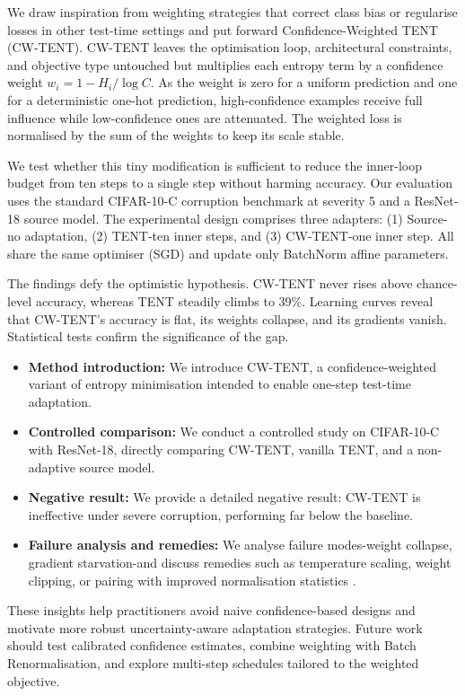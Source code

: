 \documentclass{article} %
\begin{document}
We draw inspiration from weighting strategies that correct class bias or regularise losses in other test-time settings \cite{author-year-test,zhao-2023-delta} and put forward Confidence-Weighted TENT (CW-TENT). CW-TENT leaves the optimisation loop, architectural constraints, and objective type untouched but multiplies each entropy term by a confidence weight \(w_{i} = 1 - H_{i}/\log C\). As the weight is zero for a uniform prediction and one for a deterministic one-hot prediction, high-confidence examples receive full influence while low-confidence ones are attenuated. The weighted loss is normalised by the sum of the weights to keep its scale stable.

We test whether this tiny modification is sufficient to reduce the inner-loop budget from ten steps to a single step without harming accuracy. Our evaluation uses the standard CIFAR-10-C corruption benchmark at severity 5 and a ResNet-18 source model. The experimental design comprises three adapters: (1) Source-no adaptation, (2) TENT-ten inner steps, and (3) CW-TENT-one inner step. All share the same optimiser (SGD) and update only BatchNorm affine parameters.

The findings defy the optimistic hypothesis. CW-TENT never rises above chance-level accuracy, whereas TENT steadily climbs to 39\%. Learning curves reveal that CW-TENT's accuracy is flat, its weights collapse, and its gradients vanish. Statistical tests confirm the significance of the gap.

\begin{itemize}
  \item \textbf{Method introduction:} We introduce CW-TENT, a confidence-weighted variant of entropy minimisation intended to enable one-step test-time adaptation.
  \item \textbf{Controlled comparison:} We conduct a controlled study on CIFAR-10-C with ResNet-18, directly comparing CW-TENT, vanilla TENT, and a non-adaptive source model.
  \item \textbf{Negative result:} We provide a detailed negative result: CW-TENT is ineffective under severe corruption, performing far below the baseline.
  \item \textbf{Failure analysis and remedies:} We analyse failure modes-weight collapse, gradient starvation-and discuss remedies such as temperature scaling, weight clipping, or pairing with improved normalisation statistics \cite{zhao-2023-delta}.
\end{itemize}

These insights help practitioners avoid naive confidence-based designs and motivate more robust uncertainty-aware adaptation strategies. Future work should test calibrated confidence estimates, combine weighting with Batch Renormalisation, and explore multi-step schedules tailored to the weighted objective.
\end{document}
